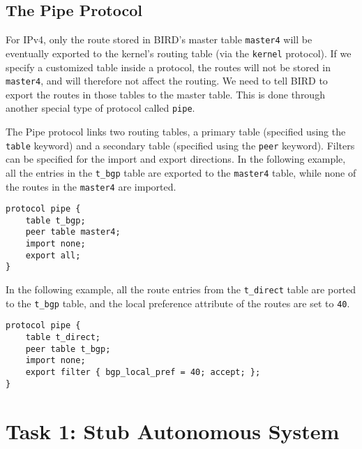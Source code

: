 \begin{lstlisting}

\end{lstlisting}
 


\subsection{The Pipe Protocol} 

For IPv4, only the route stored in BIRD's master table \texttt{master4} will be eventually
exported to the kernel's routing table (via the \texttt{kernel} protocol). 
If we specify a customized table
inside a protocol, the routes will not be stored in \texttt{master4},
and will therefore not affect the routing. We need to tell BIRD
to export the routes in those tables to the master table. This is done 
through another special type of protocol called \texttt{pipe}. 

The Pipe protocol links two routing tables, a primary table (specified using
the \texttt{table} keyword) and a secondary table (specified using 
the \texttt{peer} keyword). Filters can be specified for the import
and export directions. In the following example, all the entries
in the \texttt{t\_bgp} table are exported to the \texttt{master4} table,
while none of the routes in the \texttt{master4} are imported. 

\begin{lstlisting}
protocol pipe {
    table t_bgp;
    peer table master4;
    import none;
    export all;
}
\end{lstlisting}

In the following example, all the route entries from the \texttt{t\_direct}
table are ported to the \texttt{t\_bgp} table, and the local preference
attribute of the routes are set to \texttt{40}.

\begin{lstlisting}
protocol pipe {
    table t_direct;
    peer table t_bgp;
    import none;
    export filter { bgp_local_pref = 40; accept; };
}
\end{lstlisting}
 


\section{Task 1: Stub Autonomous System} 


